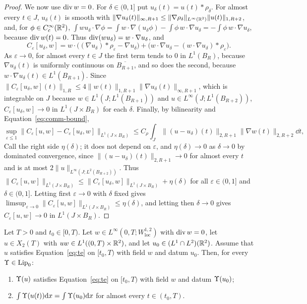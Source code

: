 \begin{proof}
We now use $\operatorname{div} w=0$. For $\delta\in(0,1]$ put $u_\delta(t)=u(t)\ast\rho_\delta$.
For almost every $t\in J$, $u_\delta(t)$ is smooth with
$\|\nabla u_\delta(t)\|_{\infty,R+1}\le\|\nabla\rho_\delta\|_{L^\infty(\mathbb{R}^2)}\|u(t)\|_{1,R+2}$,
and, for $\phi\in C_c^\infty(\mathbb{R}^2)$,
$\int wu_\delta\cdot\nabla\phi=\int w\cdot\nabla(u_\delta\phi)-\int\phi\,w\cdot\nabla u_\delta=-\int\phi\,w\cdot\nabla u_\delta$,
because $\operatorname{div} w(t)=0$. Thus $\operatorname{div}(wu_\delta)=w\cdot\nabla u_\delta$, and
\[
C_\varepsilon[u_\delta,w]=w\cdot\big((\nabla u_\delta)\ast\rho_\varepsilon-\nabla u_\delta\big)
+\big(w\cdot\nabla u_\delta-(w\cdot\nabla u_\delta)\ast\rho_\varepsilon\big).
\]
As $\varepsilon\to0$, for almost every $t\in J$ the first term tends to $0$ in
$L^1(B_R)$, because $\nabla u_\delta(t)$ is uniformly continuous on
$\overline{B_{R+1}}$, and so does the second, because
$w\cdot\nabla u_\delta(t)\in L^1(B_{R+1})$. Since
$\|C_\varepsilon[u_\delta,w](t)\|_{1,R}\le4\|w(t)\|_{1,R+1}\|\nabla u_\delta(t)\|_{\infty,R+1}$,
which is integrable on $J$ because $w\in L^1(J;L^1(B_{R+1}))$ and
$u\in L^\infty(J;L^1(B_{R+2}))$, $C_\varepsilon[u_\delta,w]\to0$ in
$L^1(J\times B_R)$ for each $\delta$. Finally, by bilinearity and
Equation~\eqref{eq:comm-bound},
\[
\sup_{\varepsilon\le1}\|C_\varepsilon[u,w]-C_\varepsilon[u_\delta,w]\|_{L^1(J\times B_R)}
\le C_\rho\int_J\|(u-u_\delta)(t)\|_{2,R+1}\|\nabla w(t)\|_{2,R+2}\dd t ,
\]
Call the right side $\eta(\delta)$; it does not depend on $\varepsilon$, and
$\eta(\delta)\to0$ as $\delta\to0$ by dominated convergence, since
$\|(u-u_\delta)(t)\|_{2,R+1}\to0$ for almost every $t$ and is at most
$2\|u\|_{L^\infty(J;L^2(B_{R+2}))}$. Thus
$\|C_\varepsilon[u,w]\|_{L^1(J\times B_R)}\le\|C_\varepsilon[u_\delta,w]\|_{L^1(J\times B_R)}+\eta(\delta)$
for all $\varepsilon\in(0,1]$ and $\delta\in(0,1]$. Letting first $\varepsilon\to0$
with $\delta$ fixed gives
$\limsup_{\varepsilon\to0}\|C_\varepsilon[u,w]\|_{L^1(J\times B_R)}\le\eta(\delta)$, and
letting then $\delta\to0$ gives $C_\varepsilon[u,w]\to0$ in $L^1(J\times B_R)$.
\end{proof}

\begin{lemma}
\label{lem:transport}
Let $T>0$ and $t_0\in[0,T)$. Let $w\in L^\infty(0,T;W^{1,2}_{\mathrm{loc}})$
with $\operatorname{div} w=0$, let $u\in X_2(T)$ with
$uw\in L^1((0,T)\times\mathbb{R}^2)$, and let $u_0\in (L^1\cap L^2)(\mathbb{R}^2)$. Assume that $u$
satisfies Equation~\eqref{eq:te} on $[t_0,T)$ with field $w$ and datum $u_0$.
Then, for every $\Upsilon\in\mathrm{Lip}_0$:
\begin{enumerate}[label=\textup{(\roman*)}]
\item $\Upsilon(u)$ satisfies Equation~\eqref{eq:te} on $[t_0,T)$ with field $w$
  and datum $\Upsilon(u_0)$;
\item $\int\Upsilon(u(t))\dd x=\int\Upsilon(u_0)\dd x$ for almost every $t\in(t_0,T)$.
\end{enumerate}
\end{lemma}

